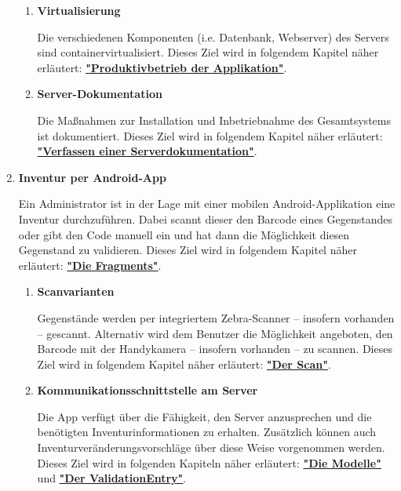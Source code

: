 \documentclass[
    headings=optiontotocandhead,%
    twoside,
    numbers=noenddot,%
    toc=flat, %
    12pt, %
    titlepage, %
    parskip=full, %
    listof=totoc, %
    listof=flat, %
    numbers=noenddot, %
    bibliography=totoc, %
    a4paper,DIV=14,
    BCOR=15mm,
]{scrbook}
\begin{document}
\begin{enumerate}
\begin{enumerate}
      \item	\textbf{Virtualisierung}

      Die verschiedenen Komponenten (i.e. Datenbank, Webserver) des Servers sind containervirtualisiert.  
      Dieses Ziel wird in folgendem Kapitel näher erläutert: \textbf{\href{produktivbetrieb-der-applikation}{"Produktivbetrieb der Applikation"}}.

      \item	\textbf{Server-Dokumentation}

      Die Maßnahmen zur Installation und Inbetriebnahme des Gesamtsystems ist dokumentiert.
      Dieses Ziel wird in folgendem Kapitel näher erläutert: \textbf{\href{verfassen-einer-serverdokumentation}{"Verfassen einer Serverdokumentation"}}.
    \end{enumerate}







      \item \textbf{Inventur per Android-App}

      Ein Administrator ist in der Lage mit einer mobilen Android-Applikation eine Inventur durchzuführen. Dabei scannt dieser den Barcode eines Gegenstandes oder gibt den Code manuell ein und hat dann die Möglichkeit diesen Gegenstand zu validieren. 
      Dieses Ziel wird in folgendem Kapitel näher erläutert: \textbf{\href{die-fragments}{"Die Fragments"}}.
      
      \begin{enumerate}
        \item	\textbf{Scanvarianten}

        Gegenstände werden per integriertem Zebra-Scanner – insofern vorhanden – gescannt. Alternativ wird dem Benutzer die Möglichkeit angeboten, den Barcode mit der Handykamera – insofern vorhanden – zu scannen. 
        Dieses Ziel wird in folgendem Kapitel näher erläutert: \textbf{\href{TODO}{"Der Scan"}}.
      
        \item	\textbf{Kommunikationsschnittstelle am Server}

        Die App verfügt über die Fähigkeit, den Server anzusprechen und die benötigten Inventurinformationen zu erhalten. Zusätzlich können auch Inventurveränderungsvorschläge über diese Weise vorgenommen werden.
        Dieses Ziel wird in folgenden Kapiteln näher erläutert: \textbf{\href{die-modelle}{"Die Modelle"}} und \textbf{\href{der-validationentry}{"Der ValidationEntry"}}.
        

\end{enumerate}
\end{enumerate}
\end{document}
